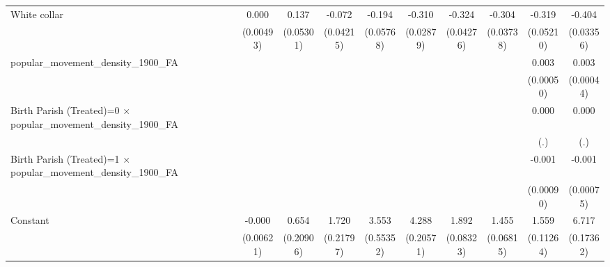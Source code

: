 {\begin{tabular}{l*{9}{c}}
White collar        &       0.000         &       0.137\sym{**} &      -0.072         &      -0.194\sym{***}&      -0.310\sym{***}&      -0.324\sym{***}&      -0.304\sym{***}&      -0.319\sym{***}&      -0.404\sym{***}\\
                    &   (0.00493)         &   (0.05301)         &   (0.04215)         &   (0.05768)         &   (0.02879)         &   (0.04276)         &   (0.03738)         &   (0.05210)         &   (0.03356)         \\
popular\_movement\_density\_1900\_FA&                     &                     &                     &                     &                     &                     &                     &       0.003\sym{***}&       0.003\sym{***}\\
                    &                     &                     &                     &                     &                     &                     &                     &   (0.00050)         &   (0.00044)         \\
Birth Parish (Treated)=0 $\times$ popular\_movement\_density\_1900\_FA&                     &                     &                     &                     &                     &                     &                     &       0.000         &       0.000         \\
                    &                     &                     &                     &                     &                     &                     &                     &         (.)         &         (.)         \\
Birth Parish (Treated)=1 $\times$ popular\_movement\_density\_1900\_FA&                     &                     &                     &                     &                     &                     &                     &      -0.001         &      -0.001         \\
                    &                     &                     &                     &                     &                     &                     &                     &   (0.00090)         &   (0.00075)         \\
Constant            &      -0.000         &       0.654\sym{**} &       1.720\sym{***}&       3.553\sym{***}&       4.288\sym{***}&       1.892\sym{***}&       1.455\sym{***}&       1.559\sym{***}&       6.717\sym{***}\\
                    &   (0.00621)         &   (0.20906)         &   (0.21797)         &   (0.55352)         &   (0.20571)         &   (0.08323)         &   (0.06815)         &   (0.11264)         &   (0.17362)         \\

\end{tabular}}
